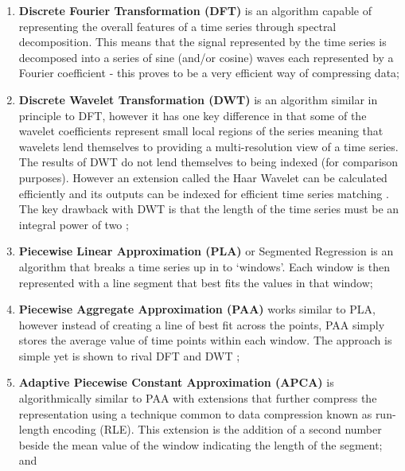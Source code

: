 \begin{enumerate}
\item \textbf{Discrete Fourier Transformation (DFT)} \cite{faloutsos1994fast} is an algorithm capable of representing the overall features of a time series through spectral decomposition.
This means that the signal represented by the time series is decomposed into a series of sine (and/or cosine) waves each represented by a Fourier coefficient \cite{keogh2001dimensionality} - this proves to be a very efficient way of compressing data; 

\item \textbf{Discrete Wavelet Transformation (DWT)} \cite{chanefficient1999} is an algorithm similar in principle to DFT, however it has one key difference in that some of the wavelet coefficients represent small local regions of the series meaning that wavelets lend themselves to providing a multi-resolution view of a time series.
The results of DWT do not lend themselves to being indexed (for comparison purposes).
However an extension called the Haar Wavelet can be calculated efficiently and its outputs can be indexed for efficient time series matching \cite{chanefficient1999}.
The key drawback with DWT is that the length of the time series must be an integral power of two \cite{keogh2001dimensionality}; 

\item \textbf{Piecewise Linear Approximation (PLA)} \cite{cameron1966piece} or Segmented Regression is an algorithm that breaks a time series up in to `windows'.
Each window is then represented with a line segment that best fits the values in that window;

\item \textbf{Piecewise Aggregate Approximation (PAA)} \cite{keogh2001dimensionality} works similar to PLA, however instead of creating a line of best fit across the points, PAA simply stores the average value of time points within each window.
The approach is simple yet is shown to rival DFT and DWT \cite{lina2003,keogh2003need}; 

\item \textbf{Adaptive Piecewise Constant Approximation (APCA)} \cite{keogh2001locally} is algorithmically similar to PAA with extensions that further compress the representation using a technique common to data compression known as run-length encoding (RLE).
This extension is the addition of a second number beside the mean value of the window indicating the length of the segment; and 


\end{enumerate}
